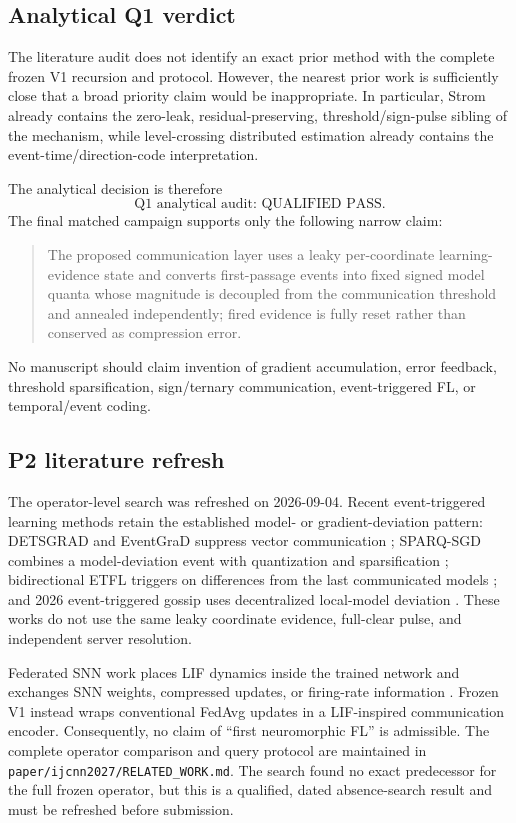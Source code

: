 \subsection{Analytical Q1 verdict}

The literature audit does not identify an exact prior method with the complete frozen V1 recursion and protocol. However, the nearest prior work is sufficiently close that a broad priority claim would be inappropriate. In particular, Strom already contains the zero-leak, residual-preserving, threshold/sign-pulse sibling of the mechanism, while level-crossing distributed estimation already contains the event-time/direction-code interpretation.

The analytical decision is therefore
\begin{equation}
\boxed{\text{Q1 analytical audit: QUALIFIED PASS}.}
\end{equation}
The final matched campaign supports only the following narrow claim:
\begin{quote}
The proposed communication layer uses a leaky per-coordinate learning-evidence state and converts first-passage events into fixed signed model quanta whose magnitude is decoupled from the communication threshold and annealed independently; fired evidence is fully reset rather than conserved as compression error.
\end{quote}
No manuscript should claim invention of gradient accumulation, error feedback, threshold sparsification, sign/ternary communication, event-triggered FL, or temporal/event coding.

\subsection{P2 literature refresh}

The operator-level search was refreshed on 2026-09-04.  Recent event-triggered
learning methods retain the established model- or gradient-deviation pattern:
DETSGRAD and EventGraD suppress vector communication
\citep{george2020detsgrad,ghosh2022eventgrad}; SPARQ-SGD combines a
model-deviation event with quantization and sparsification
\citep{singh2023sparq}; bidirectional ETFL triggers on differences from the
last communicated models \citep{he2023etfl}; and 2026 event-triggered gossip
uses decentralized local-model deviation \citep{zhai2026gossip}.  These works
do not use the same leaky coordinate evidence, full-clear pulse, and independent
server resolution.

Federated SNN work places LIF dynamics inside the trained network and exchanges
SNN weights, compressed updates, or firing-rate information
\citep{venkatesha2021fedsnn,chaki2023tradeoffs,tao2026sfedhifi}.  Frozen V1
instead wraps conventional FedAvg updates in a LIF-inspired communication
encoder.  Consequently, no claim of ``first neuromorphic FL'' is admissible.
The complete operator comparison and query protocol are maintained in
\texttt{paper/ijcnn2027/RELATED\_WORK.md}.  The search found no exact
predecessor for the full frozen operator, but this is a qualified, dated
absence-search result and must be refreshed before submission.

